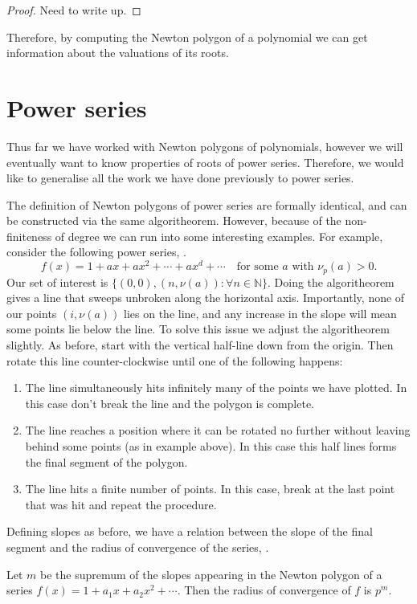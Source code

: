 \begin{proof}
  Need to write up.
\end{proof}

Therefore, by computing the Newton polygon of a polynomial we can get information about the
valuations of its roots.

\section{Power series}

Thus far we have worked with Newton polygons of polynomials, however we will eventually want to
know properties of roots of power series. Therefore, we would like to generalise all the work we
have done previously to power series.

The definition of Newton polygons of power series are formally identical, and can be constructed
via the same algoritheorem. However, because of the non-finiteness of degree we can run into some
interesting examples.
For example, consider the following power series, \cite[Page~260]{Gouvea}.
\[
f(x) = 1 + a x + ax^2 + \cdots +a x^d +\cdots \quad \text{for some } a \text{ with } \nu_p(a) > 0.
\]
Our set of interest is $\{(0,0),(n,\nu (a))  : \forall n \in \mathbb{N} \}.$ Doing the algoritheorem
gives a line that sweeps unbroken along the horizontal axis. Importantly, none of our points
$(i, \nu (a))$ lies on the line, and any increase in the slope will mean some points lie below the
line.
To solve this issue we adjust the algoritheorem slightly. As before, start with the vertical half-line
down from the origin. Then rotate this line counter-clockwise until one of the following happens:
\begin{enumerate}
    \item The line simultaneously hits infinitely many of the points we have plotted.
    In this case don't break the line and the polygon is complete.
    \item The line reaches a position where it can be rotated no further without leaving behind some
    points (as in example above). In this case this half lines forms the final segment of the
    polygon.
    \item The line hits a finite number of points. In this case, break at the last point that was
    hit and repeat the procedure.
\end{enumerate}

Defining slopes as before, we have a relation between the slope of the final segment and the
radius of convergence of the series, \cite[Lemma~7.4.8]{Gouvea}.
\begin{theorem} \label{RadofCon}
    Let $m$ be the supremum of the slopes appearing in the Newton polygon of a series
    $f(x) = 1 + a_1 x + a_2 x^2 + \cdots$. Then the radius of convergence of $f$ is $p^m.$
\end{theorem}

